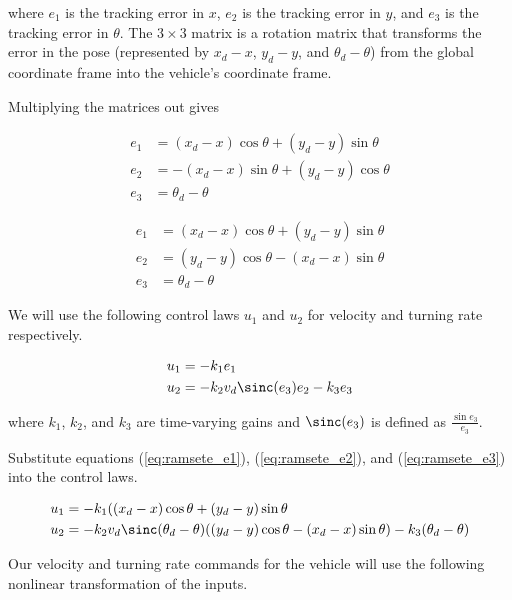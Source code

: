 where $e_1$ is the tracking \gls{error} in $x$, $e_2$ is the tracking
\gls{error} in $y$, and $e_3$ is the tracking \gls{error} in $\theta$.
The $3 \times 3$ matrix is a rotation matrix that transforms the \gls{error} in
the \gls{pose} (represented by $x_d - x$, $y_d - y$, and $\theta_d - \theta$)
from the global coordinate frame into the vehicle's coordinate frame.

Multiplying the matrices out gives

\begin{align*}
  e_1 &= (x_d - x) \cos\theta + (y_d - y) \sin\theta \\
  e_2 &= -(x_d - x) \sin\theta + (y_d - y) \cos\theta \\
  e_3 &= \theta_d - \theta
\end{align*}

\begin{align}
  e_1 &= (x_d - x) \cos\theta + (y_d - y) \sin\theta \label{eq:ramsete_e1} \\
  e_2 &= (y_d - y) \cos\theta - (x_d - x) \sin\theta \label{eq:ramsete_e2} \\
  e_3 &= \theta_d - \theta \label{eq:ramsete_e3}
\end{align}

We will use the following control laws $u_1$ and $u_2$ for velocity and turning
rate respectively.

\begin{equation}
  \begin{aligned}
    u_1 &= -k_1 e_1 \\
    u_2 &= -k_2 v_d \sinc(e_3) e_2 - k_3 e_3
  \end{aligned}
  \label{eq:ramsete_u}
\end{equation}

where $k_1$, $k_2$, and $k_3$ are time-varying gains and $\sinc(e_3)$ is defined
as $\frac{\sin{e_3}}{e_3}$.

Substitute equations (\ref{eq:ramsete_e1}), (\ref{eq:ramsete_e2}), and
(\ref{eq:ramsete_e3}) into the control laws.

\begin{align*}
  u_1 &= -k_1 ((x_d - x) \cos\theta + (y_d - y) \sin\theta \\
  u_2 &= -k_2 v_d \sinc(\theta_d - \theta)
    ((y_d - y) \cos\theta - (x_d - x) \sin\theta) - k_3 (\theta_d - \theta)
\end{align*}

Our velocity and turning rate commands for the vehicle will use the following
nonlinear transformation of the inputs.

